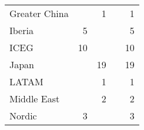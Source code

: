 \begin{table}[]
\begin{tabular}{@{}lrrrr@{}}
\multicolumn{1}{l|}{Greater China}                                  &                                                             & 1                                                                     &                                                                      & 1                                                                  \\
\multicolumn{1}{l|}{Iberia}                                         & 5                                                           &                                                                       &                                                                      & 5                                                                  \\
\multicolumn{1}{l|}{ICEG}                                           & 10                                                          &                                                                       &                                                                      & 10                                                                 \\
\multicolumn{1}{l|}{Japan}                                          &                                                             & 19                                                                    &                                                                      & 19                                                                 \\
\multicolumn{1}{l|}{LATAM}                                          &                                                             & 1                                                                     &                                                                      & 1                                                                  \\
\multicolumn{1}{l|}{Middle East}                                    &                                                             & 2                                                                     &                                                                      & 2                                                                  \\
\multicolumn{1}{l|}{Nordic}                                         & 3                                                           &                                                                       &                                                                      & 3                                                                  \\

\end{tabular}
\end{table}
